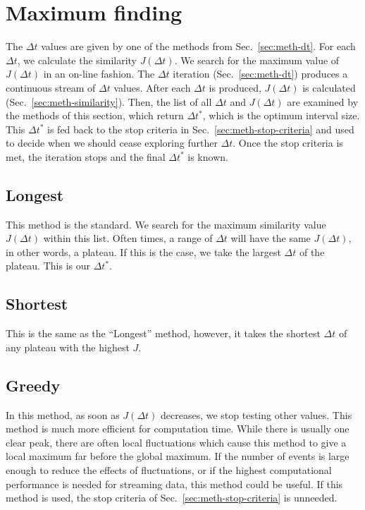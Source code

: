 \documentclass[draft]{article}
\begin{document}
\section{Maximum finding}
\label{sec:meth-peak}
The $\Delta t$ values are given by one of the methods from
Sec.~\ref{sec:meth-dt}.  For each $\Delta t$, we calculate the
similarity $J(\Delta t)$.  We search for the maximum value of
$J(\Delta t)$ in an on-line fashion.  The $\Delta t$ iteration
(Sec.~\ref{sec:meth-dt}) produces a continuous stream of $\Delta t$
values.  After each $\Delta t$ is produced, $J(\Delta t)$ is
calculated (Sec.~\ref{sec:meth-similarity}).  Then, the list of all
$\Delta t$ and $J(\Delta t)$ are examined by the methods of this
section, which return $\Delta t^*$, which is the optimum interval
size.  This $\Delta t^*$ is fed back to the stop criteria in
Sec.~\ref{sec:meth-stop-criteria} and used to decide when we should
cease exploring further $\Delta t$.  Once the stop criteria is met,
the iteration stops and the final $\Delta t^*$ is known.

\subsection{Longest}

This method is the standard.  We search for the maximum similarity
value $J(\Delta t)$ within this list.  Often times, a range
of $\Delta t$ will have the same $J(\Delta t)$, in other words, a
plateau.  If this is the case, we take the largest $\Delta t$ of the
plateau.  This is our $\Delta t^*$.

\subsection{Shortest}

This is the same as the ``Longest'' method, however, it takes the
shortest $\Delta t$ of any plateau with the highest $J$.

\subsection{Greedy}

In this method, as soon as $J(\Delta t)$ decreases, we stop testing
other values.  This method is much more efficient for computation
time.  While there is usually one clear peak, there are often local
fluctuations which cause this method to give a local maximum far
before the global maximum.  If the number of events is large enough to
reduce the effects of fluctuations, or if the highest computational
performance is needed for streaming data, this method could be useful.
If this method is used, the stop criteria of
Sec.~\ref{sec:meth-stop-criteria} is unneeded.
\end{document}
